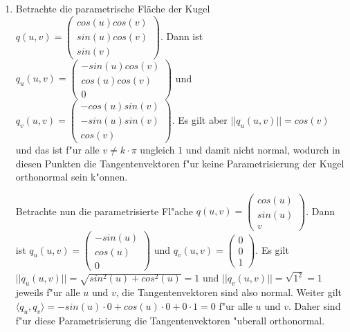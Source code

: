 \documentclass[a4paper,10pt]{scrartcl}
\begin{document}
\begin{enumerate}[1.]
\item Betrachte die parametrische Fläche der Kugel $q(u,v) = \begin{pmatrix}cos(u)cos(v)\\sin(u)cos(v)\\sin(v)\end{pmatrix}$. Dann ist $q_u(u,v) = \begin{pmatrix}-sin(u)cos(v)\\cos(u)cos(v)\\0\end{pmatrix}$ und $q_v(u,v) = \begin{pmatrix}-cos(u)sin(v)\\-sin(u)sin(v)\\cos(v)\end{pmatrix}$. Es gilt aber $||q_u(u,v)|| = cos(v)$ und das ist f"ur alle $v \neq k \cdot \pi$ ungleich $1$ und damit nicht normal, wodurch in diesen Punkten die Tangentenvektoren f"ur keine Parametrisierung der Kugel orthonormal sein k"onnen.

Betrachte nun die parametrisierte Fl"ache $q(u,v) = \begin{pmatrix}cos(u)\\sin(u)\\v\end{pmatrix}$. Dann ist $q_u(u,v) = \begin{pmatrix}-sin(u)\\cos(u)\\0\end{pmatrix}$ und $q_v(u,v) = \begin{pmatrix}0\\0\\1\end{pmatrix}$. Es gilt $||q_u(u,v)|| = \sqrt{sin^2(u) + cos^2(u)} = 1$ und $||q_v(u,v)|| = \sqrt{1^2} = 1$ jeweils f"ur alle $u$ und $v$, die Tangentenvektoren sind also normal. Weiter gilt $\langle q_u, q_v \rangle = -sin(u) \cdot 0 + cos(u) \cdot 0 + 0 \cdot 1 = 0$ f"ur alle $u$ und $v$. Daher sind f"ur diese Parametrisierung die Tangentenvektoren "uberall orthonormal.


\end{enumerate}
\end{document}
